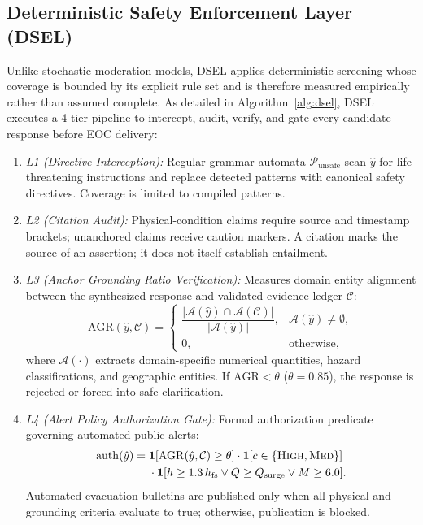 \documentclass[conference]{IEEEtran}
\begin{document}
\subsection{Deterministic Safety Enforcement Layer (DSEL)}
Unlike stochastic moderation models, DSEL applies deterministic screening whose coverage is bounded by its explicit rule set and is therefore measured empirically rather than assumed complete. As detailed in Algorithm~\ref{alg:dsel}, DSEL executes a 4-tier pipeline to intercept, audit, verify, and gate every candidate response before EOC delivery:
\begin{enumerate}
    \item \textit{L1 (Directive Interception):} Regular grammar automata $\mathcal{P}_{\mathrm{unsafe}}$ scan $\hat{y}$ for life-threatening instructions and replace detected patterns with canonical safety directives. Coverage is limited to compiled patterns.
    \item \textit{L2 (Citation Audit):} Physical-condition claims require source and timestamp brackets; unanchored claims receive caution markers. A citation marks the source of an assertion; it does not itself establish entailment.
    \item \textit{L3 (Anchor Grounding Ratio Verification):} Measures domain entity alignment between the synthesized response and validated evidence ledger $\mathcal{C}$:
    \begin{equation}
    \mathrm{AGR}(\hat{y}, \mathcal{C}) =
    \begin{cases}
    \dfrac{|\mathcal{A}(\hat{y}) \cap \mathcal{A}(\mathcal{C})|}{|\mathcal{A}(\hat{y})|}, & \mathcal{A}(\hat{y}) \neq \emptyset,\\[6pt]
    0, & \text{otherwise,}
    \end{cases}
    \label{eq:agr}
    \end{equation}
    where $\mathcal{A}(\cdot)$ extracts domain-specific numerical quantities, hazard classifications, and geographic entities. If $\mathrm{AGR} < \theta$ ($\theta = 0.85$), the response is rejected or forced into safe clarification.
    \item \textit{L4 (Alert Policy Authorization Gate):} Formal authorization predicate governing automated public alerts:
    \begin{equation}
    \label{eq:auth}
    \begin{aligned}
    \mathrm{auth}(\hat{y}) =\;& \mathbf{1}[\mathrm{AGR}(\hat{y}, \mathcal{C}) \ge \theta] \cdot \mathbf{1}[c \in \{\textsc{High}, \textsc{Med}\}] \\
    & \cdot \mathbf{1}[h \ge 1.3\,h_{\mathrm{fs}} \lor Q \ge Q_{\mathrm{surge}} \lor M \ge 6.0].
    \end{aligned}
    \end{equation}
    Automated evacuation bulletins are published only when all physical and grounding criteria evaluate to true; otherwise, publication is blocked.
\end{enumerate}
\end{document}
